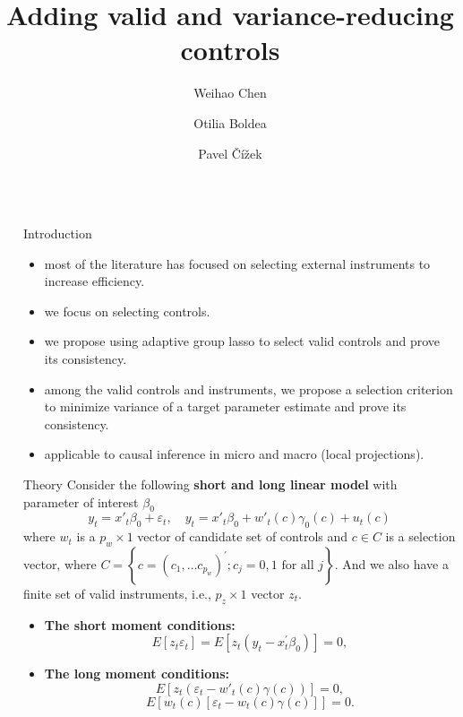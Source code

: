 \documentclass[final]{beamer}
\title{Adding valid and variance-reducing controls}
\author{ Weihao Chen\inst{1} \and Otilia Boldea\inst{1}  \and Pavel Čížek \inst{1}}
\institute[shortinst]{\inst{1} Department of Econometrics \& OR, Tilburg University }
\newlength{\sepwidth}
\newlength{\colwidth}
\newcommand{\separatorcolumn}{\begin{column}{\sepwidth}\end{column}}
\begin{document}
\begin{frame}[t]
\begin{columns}[t]
\separatorcolumn

\begin{column}{\colwidth}
  \begin{block}{Introduction}
  \vspace{-5mm}
  \begin{itemize}[label=$\bullet$]
      \item most of the literature has focused on selecting external instruments to increase efficiency.
      \item we focus on selecting controls.
      \item we propose using adaptive group lasso to select valid controls and prove its consistency.
      \item among the valid controls and instruments, we propose a selection criterion to minimize variance of a target parameter estimate and prove its consistency.
       \item applicable to causal inference in micro and macro (local projections).
  \end{itemize}
  \end{block}
  \vspace{-5mm}
\begin{block}{Theory}
Consider the following \textbf{short and long linear model} with parameter of interest $\beta_0$ 
     $$
     y_{t}=x'_{t}\beta_{0}+\varepsilon_{t},\quad y_{t}=x'_{t}\beta_{0}+w'_{t}(c)\gamma_{0}(c)+u_{t}(c)
     $$
     where $w_{t}$ is a $p_w\times 1$  vector of candidate set of controls and $c\in C$ is a selection vector, where $C=\left\{ c=\left(c_{1},\ldots c_{p_{w}}\right)^{\prime};c_{j}=0,1 \text{ for all }j\right\}$. And we also have a finite set of valid instruments, i.e., $p_z\times 1$ vector $z_{t}$. 
     
     \begin{itemize}[label = \bullet]
         \item \textbf{The short moment conditions:}
            $$
    E\left[z_{t}\varepsilon_{t}\right]=E\left[z_{t}(y_{t}-x_{t}^{\prime}\beta_{0})\right]=0
    ,
    $$
         \item \textbf{The long moment conditions:}
         $$
    E\left[z_{t}\left(\varepsilon_{t}-w'_{t}(c)\gamma(c)\right)\right]=0,
    $$
    $$
    E\left[w_{t}(c)\left[\varepsilon_{t}-w_{t}(c)\gamma(c)\right]\right]=0.
    $$
     \end{itemize}
    

\end{block}
\end{column}
\end{columns}
\end{frame}
\end{document}
